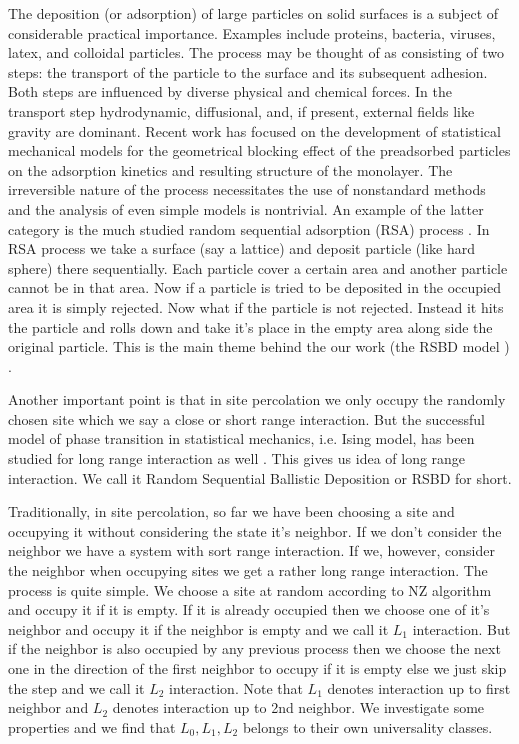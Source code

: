 	
	The deposition (or adsorption) of large particles on	solid surfaces is a subject of considerable practical importance. Examples include proteins, bacteria, viruses, latex,	and colloidal particles. The process may be thought of as	consisting of two steps: the transport of the particle to
	the surface and its subsequent adhesion. Both steps are	influenced by diverse physical and chemical forces. In	the transport step hydrodynamic, diffusional, and, if	present, external fields like gravity are dominant. Recent	work has focused on the development of statistical	mechanical models for the geometrical blocking effect of	the preadsorbed particles on the adsorption kinetics and
	resulting structure of the monolayer. The irreversible nature of the process necessitates the use of nonstandard	methods and the analysis of even simple models is nontrivial. An example of the latter category is the much	studied random sequential adsorption (RSA) process \cite{Talbot1992, Renyi1958, Widom1966}. In RSA process we take a surface (say a lattice) and deposit particle (like hard sphere) there sequentially. Each particle cover a certain area and another particle cannot be in that area. Now if a particle is tried to be deposited in the occupied area it is simply rejected.	Now what if	the particle is not rejected. Instead it hits the particle and rolls down and take it's place in the empty area along side the original particle. This is the main theme behind the our work (the RSBD model \cite{Talbot1992}) .
	
	
	Another important point is that in site percolation we only occupy the randomly chosen site which we say a close or short range interaction. But the successful model of phase transition in statistical mechanics, i.e. Ising model, has been studied for long range interaction as well \cite{Hiley1965, Cannas1995}. This gives us idea of long range interaction. We call it Random Sequential Ballistic Deposition or RSBD for short.
	
	Traditionally, in site percolation, so far we have been choosing a site and occupying it without considering the state it's neighbor. If we don't consider the neighbor we have a system with sort range interaction. If we, however, consider the neighbor when occupying sites we get a rather long range interaction. The process is quite simple. We choose a site at random according to NZ algorithm and occupy it if it is empty. If it is already occupied then we choose one of it's neighbor and occupy it if the neighbor is empty and we call it $L_1$ interaction. But if the neighbor is also occupied by any previous process then we choose the next one in the direction of the first neighbor to occupy if it is empty else we just skip the step and we call it $L_2$ interaction. Note that $L_1$ denotes interaction up to first neighbor and $L_2$ denotes interaction up to 2nd neighbor.  We investigate some properties and we find that $L_0, L_1, L_2$ belongs to their own universality classes.
	

